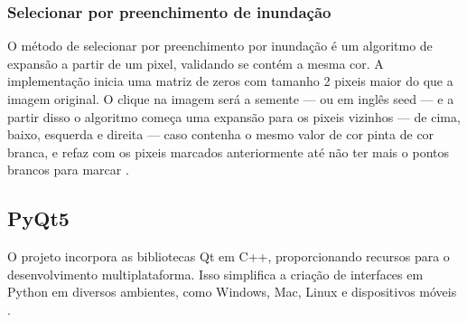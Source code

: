 \subsubsection{Selecionar por preenchimento de inundação}
\label{subsubsec:sel_floodFill}

O método de  selecionar por preenchimento por inundação é um algoritmo de expansão a partir de um pixel, validando se contém a mesma cor. A implementação inicia uma matriz de zeros com tamanho 2 pixeis maior do que a imagem original. O clique na  imagem será a semente — ou em inglês  seed — e a partir disso o algoritmo começa uma expansão para os pixeis vizinhos — de cima, baixo, esquerda e direita — caso contenha o mesmo valor de cor pinta de cor branca, e refaz com os pixeis marcados  anteriormente até não ter mais o pontos brancos para marcar \cite{OpenCVFloodFill}.

\subsection{PyQt5}

O projeto incorpora as bibliotecas Qt em C++, proporcionando recursos para o desenvolvimento multiplataforma. Isso simplifica a criação de interfaces em Python em diversos ambientes, como Windows, Mac, Linux e dispositivos móveis \cite{pyqt5}.








